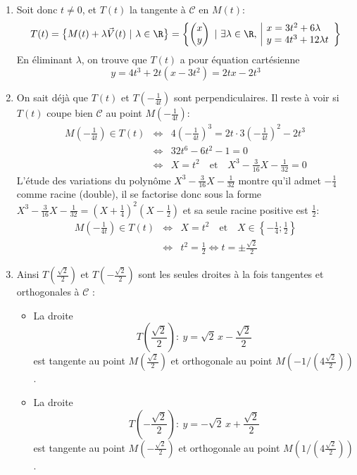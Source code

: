 {{\begin{enumerate}
  \item Soit donc $t\not=0$, et $T(t)$ la tangente à $\mathcal{C}$ en $M(t)$:
$$T(t)=\big\{M(t)+\lambda\vec{V}(t)\ |\ \lambda\in\R\big\}=\left\{\begin{pmatrix}x\\ y\end{pmatrix}\ |\ \exists\lambda\in\R,\ \begin{array}{|l}x=3t^2+6\lambda\\ y=4t^3+12\lambda t\end{array}\right\}$$
En éliminant $\lambda$, on trouve que $T(t)$ a pour équation cartésienne 
$$y=4t^3+2t(x-3t^2)=2tx-2t^3$$

  \item On sait déjà que $T(t)$ et $T(-\frac{1}{4t})$ sont perpendiculaires. Il reste à voir si $T(t)$ coupe bien $\mathcal{C}$ au point $M(-\frac{1}{4t})$:
\begin{eqnarray*}
M\left(-\frac{1}{4t}\right)\in T(t)&\Longleftrightarrow& 4\left(-\frac{1}{4t}\right)^3=2t\cdot 3\left(-\frac{1}{4t}\right)^2-2t^3\\
 &\Longleftrightarrow& 32t^6-6t^2-1=0\\
 &\Longleftrightarrow& X=t^2\quad\mathrm{et}\quad X^3-\frac{3}{16}X-\frac{1}{32}=0
\end{eqnarray*}
L'étude des variations du polyn\^ome $X^3-\frac{3}{16}X-\frac{1}{32}$ montre qu'il admet $-\frac{1}{4}$ comme racine (double), il se factorise donc sous la forme $X^3-\frac{3}{16}X-\frac{1}{32}=(X+\frac{1}{4})^2(X-\frac{1}{2})$ et sa seule racine positive est $\frac{1}{2}$:
\begin{eqnarray*}
M\left(-\frac{1}{4t}\right)\in T(t)&\Longleftrightarrow& X=t^2\quad\mathrm{et}\quad X\in\left\{-\frac{1}{4};\frac{1}{2}\right\}\\
 &\Longleftrightarrow& t^2=\frac{1}{2}\Longleftrightarrow t=\pm\frac{\sqrt{2}}{2}
\end{eqnarray*}

  \item 
Ainsi $T(\frac{\sqrt{2}}{2})$ et $T(-\frac{\sqrt{2}}{2})$ sont les seules 
droites à la fois tangentes et orthogonales à $\mathcal{C}$ :

\begin{itemize}
  \item La droite 
$$T(\frac{\sqrt{2}}{2}):\ y=\sqrt{2}\,x-\frac{\sqrt{2}}{2}$$
est tangente au point $M(\frac{\sqrt{2}}{2})$ et orthogonale au point $M(-1/(4\frac{\sqrt{2}}{2}))$.
  
  \item La droite 
$$T(-\frac{\sqrt{2}}{2}):\ y=-\sqrt{2}\,x+\frac{\sqrt{2}}{2}$$
est tangente au point $M(-\frac{\sqrt{2}}{2})$ et orthogonale au point $M(1/(4\frac{\sqrt{2}}{2}))$.
\end{itemize}


\end{enumerate}}}
